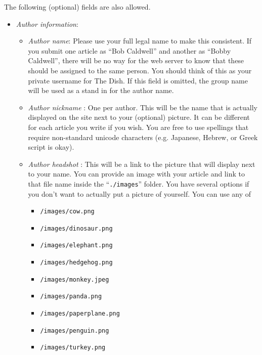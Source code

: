 \documentclass[paper=a4, fontsize=11pt]{scrartcl}
\numberwithin{equation}{section}        %
\numberwithin{figure}{section}            %
\numberwithin{table}{section}                %
\begin{document}
\noindent{}The following (optional) fields are also allowed.
\begin{itemize}
    \item \emph{Author information}:
        \begin{itemize}
            \item \emph{Author name}: Please use your full legal name to make this consistent. If
                you submit one article as ``Bob Caldwell'' and another as ``Bobby
                Caldwell'', there will be no way for the web server to know that
                these should be assigned to the same person. You should think of
                this as your private username for The Dish.
                If this field is omitted, the group name will be used as a stand in for
                the author name.
            \item \emph{Author nickname} : One per author. This will be the name that is
                actually displayed on the site next to your (optional) picture. It can
                be different for each article you write if you wish. You are
                free to use spellings that require non-standard unicode
                characters (e.g. Japanese, Hebrew, or Greek script is okay).
            \item \emph{Author headshot} : This will be a link to the picture
                that will display next to your name.  You can provide an image
                with your article and link to that file name inside the
                ``\texttt{./images}'' folder. You have several options if you
                don't want to actually put a picture of yourself. You can use
                any of
                \begin{itemize}
                    \item \texttt{/images/cow.png}
                    \item \texttt{/images/dinosaur.png}
                    \item \texttt{/images/elephant.png}
                    \item \texttt{/images/hedgehog.png}
                    \item \texttt{/images/monkey.jpeg}
                    \item \texttt{/images/panda.png}
                    \item \texttt{/images/paperplane.png}
                    \item \texttt{/images/penguin.png}
                    \item \texttt{/images/turkey.png}

\end{itemize}
\end{itemize}
\end{itemize}
\end{document}
